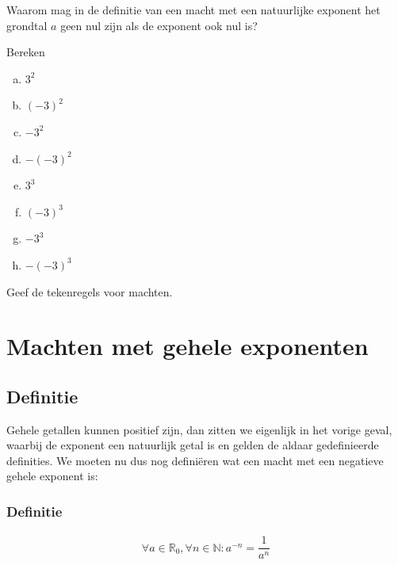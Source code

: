 \documentclass[12pt,twoside,a4paper]{article}
\begin{document}
\begin{oefening}
Waarom mag in de definitie van een macht met een natuurlijke exponent het grondtal $a$ geen nul zijn als de exponent ook nul is?
\end{oefening}

\begin{oefening}
Bereken
\begin{multicols}{2}
\begin{enumerate}[(a)]
  \itemsep1em
  \item $3^2$
  \item $(-3)^2$
  \item $-3^2$
  \item $-(-3)^2$
  \item $3^3$
  \item $(-3)^3$
  \item $-3^3$
  \item $-(-3)^3$
\end{enumerate}
\end{multicols}
\end{oefening}

\begin{oefening}
Geef de tekenregels voor machten.
\end{oefening}

\cleardoublepage
\section{Machten met gehele exponenten}

\subsection{Definitie}

Gehele getallen kunnen positief zijn, dan zitten we eigenlijk in het vorige geval, waarbij de exponent een natuurlijk getal is en gelden de aldaar gedefinieerde definities. We moeten nu dus nog definiëren wat een macht met een negatieve gehele exponent is:
\subsubsection*{Definitie}
\begin{mdframed}
\begin{align*}
\forall a \in \mathbb{R}_0, \forall n\in \mathbb{N}: a^{-n} =\dfrac{1}{a^n}
\end{align*}
\end{mdframed}
\end{document}
